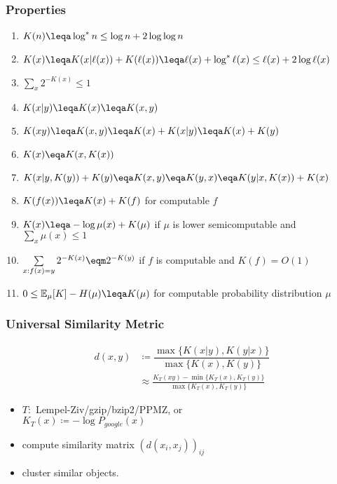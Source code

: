\documentclass[UTF8,11pt,colorlinks,compress,openany]{beamer}%
\begin{document}
\begin{frame}\frametitle{Properties}
	\begin{enumerate}
		\item $K(n)\leqa \log^* n\leq \log n+2\log\log n$
		\item $K(x)\leqa K(x|\ell(x))+K(\ell(x))\leqa\ell(x)+\log^* \ell(x) \leq \ell(x)+2\log \ell(x)$
		\item $\sum_x 2^{-K(x)}\leq 1$
		\item $K(x|y)\leqa K(x)\leqa K(x,y)$
		\item $K(xy)\leqa K(x,y)\leqa K(x)+K(x|y)\leqa K(x)+K(y)$
		\item $K(x)\eqa K(x,K(x))$
		\item $K(x|y,K(y))+K(y)\eqa K(x,y)\eqa K(y,x)\eqa K(y|x,K(x))+K(x)$
		\item $K(f(x))\leqa K(x)+K(f)$ for computable $f$
		\item $K(x)\leqa-\log \mu(x)+K(\mu)$ if $\mu$ is lower semicomputable and $\sum_x \mu(x)\leq 1$
		\item $\sum\limits_{x:f(x)=y} 2^{-K(x)}\eqm 2^{-K(y)}$ if $f$ is computable and $K(f)=O(1)$
		\item $0\leq \mathbb{E}_\mu [K] - H(\mu) \leqa K(\mu)$ for computable probability distribution $\mu$
	\end{enumerate}
\end{frame}

\begin{frame}\frametitle{Universal Similarity Metric}
	\begin{align*}
	d(x,y)&\coloneqq \dfrac{\max\{K(x|y),K(y|x)\}}{\max\{K(x), K(y)\}}\\
	&\approx\frac{K_T(xy)-\min\{K_T(x),K_T(y)\}}{\max\{K_T(x),K_T(y)\}}
	\end{align*}
	\begin{itemize}
		\item $T:$ Lempel-Ziv/gzip/bzip2/PPMZ, or\\
		$K_T(x)\coloneqq -\log P_{google}(x)$
		\item compute similarity matrix $\left(d(x_i,x_j)\right)_{ij}$
		\item cluster similar objects.
	\end{itemize}
\end{frame}
\end{document}
